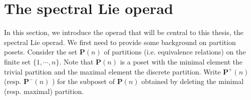 %
%
%
%
\section{The spectral Lie operad}
In this section, we introduce the operad that will be central to this thesis, the spectral Lie operad. 
We first need to provide some background on partition posets. 
Consider the set $\mathbf{P}(n)$ of partitions (i.e. equivalence relations) on the finite set $\{1, \cdots, n \}$. Note that $\mathbf{P}(n)$ is a poset with the minimal element the trivial partition and the maximal element the discrete partition.
Write $\mathbf{P}^{+}(n)$ (resp. $\mathbf{P}^{-}(n)$ ) for the subposet of $\mathbf{P}(n)$ obtained by deleting the minimal (resp. maximal) partition.


